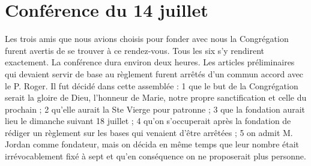 \section*{Conférence du 14 juillet}
Les trois amis que nous avions choisis pour fonder avec nous la Congrégation furent avertis de se trouver à ce rendez-vous. Tous les six s'y rendirent exactement. La conférence dura environ deux heures. Les articles préliminaires qui devaient servir de base au règlement furent arrêtés d'un commun accord avec le P. Roger. Il fut décidé dans cette assemblée : 1 que le but de la Congrégation serait la gloire de Dieu, l'honneur de Marie, notre propre sanctification et celle du prochain ; 2 qu'elle aurait la Ste Vierge pour patronne ; 3 que la
fondation aurait lieu le dimanche suivant 18 juillet ; 4 qu'on s'occuperait après la fondation de rédiger un règlement sur les bases qui venaient d'être arrêtées ; 5 on admit M. Jordan comme fondateur, mais on décida en même temps que leur nombre était irrévocablement fixé à sept et qu'en conséquence on ne proposerait plus personne.

